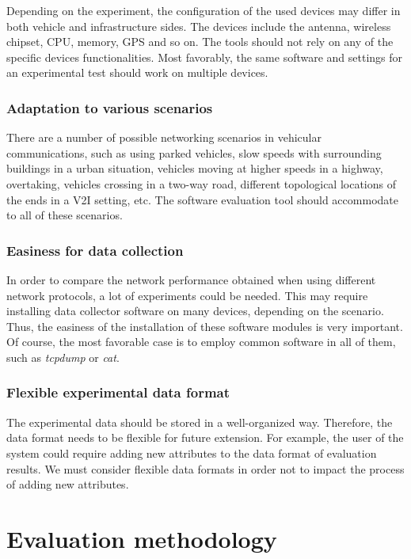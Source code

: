 \documentclass[fonts]{icst}
\begin{document}
Depending on the experiment, the configuration of the used devices may differ in
both vehicle and infrastructure sides. The devices include the antenna, wireless
chipset, CPU, memory, GPS and so on. The tools should not rely on any of the
specific devices functionalities. Most favorably, the same software and 
settings for an experimental test should work on multiple devices. 

\subsubsection{Adaptation to various scenarios}

There are a number of possible networking scenarios in vehicular communications,
such as using parked vehicles, slow speeds with surrounding buildings in a urban
situation, vehicles moving at higher speeds in a highway, overtaking, vehicles
crossing in a two-way road, different topological locations of the ends in a V2I
setting, etc. The software evaluation tool should accommodate to all of these
scenarios.   

\subsubsection{Easiness for data collection}

In order to compare the network performance obtained when using different
network protocols, a lot of experiments could be needed. This may require
installing data collector software on many devices, depending on the scenario.
Thus, the easiness of the installation of these software modules is very
important. Of course, the most favorable case is to employ common software in
all of them, such as \textit{tcpdump} or \textit{cat}. 
 
\subsubsection{Flexible experimental data format}

The experimental data should be stored in a well-organized way. Therefore, the data
format needs to be flexible for future extension. For example, the user of the
system could require adding new attributes to the data format of evaluation
results. We must consider flexible data formats in order not to impact the
process of adding new attributes. 
 



\section{Evaluation methodology}
\label{lbl:methodology}
\end{document}
